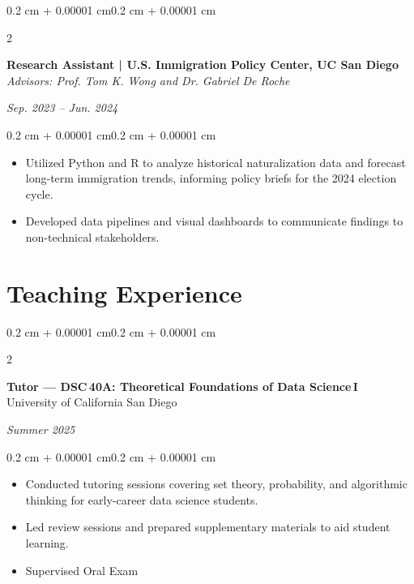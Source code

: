 \documentclass[10pt, letterpaper]{article}
\newenvironment{highlights}{
    \begin{itemize}[
        topsep=0.10 cm,
        parsep=0.10 cm,
        partopsep=0pt,
        itemsep=0pt,
        leftmargin=0.4 cm + 10pt
    ]
}{\end{itemize}}
\newenvironment{onecolentry}{
    \begin{adjustwidth}{0.2 cm + 0.00001 cm}{0.2 cm + 0.00001 cm}
}{\end{adjustwidth}}
\newenvironment{twocolentry}[2][]{
    \onecolentry
    \def\secondColumn{#2}
    \setcolumnwidth{\fill, 4.5 cm}
    \begin{paracol}{2}
}{
    \switchcolumn \raggedleft \secondColumn
    \end{paracol}
    \endonecolentry
}
\begin{document}
    \begin{twocolentry}{\textit{Sep. 2023 -- Jun. 2024}}
        \textbf{Research Assistant | U.S. Immigration Policy Center, UC San Diego}\\
        \textit{Advisors: Prof. Tom K. Wong and Dr. Gabriel De Roche}
    \end{twocolentry}
    \vspace{0.10 cm}
    \begin{onecolentry}
        \begin{highlights}
            \item Utilized Python and R to analyze historical naturalization data and forecast long-term immigration trends, informing policy briefs for the 2024 election cycle.
            \item Developed data pipelines and visual dashboards to communicate findings to non-technical stakeholders.
        \end{highlights}
    \end{onecolentry}

    \section{Teaching Experience}

    \begin{twocolentry}{\textit{Summer 2025}}
        \textbf{Tutor — DSC\,40A: Theoretical Foundations of Data Science\,I}\\
        University of California San Diego
    \end{twocolentry}

    \vspace{0.10 cm}
    \begin{onecolentry}
        \begin{highlights}
            \item Conducted tutoring sessions covering set theory, probability, and algorithmic thinking for early‑career data science students.
            \item Led review sessions and prepared supplementary materials to aid student learning.
            \item Supervised Oral Exam
        \end{highlights}
    \end{onecolentry}
\end{document}
